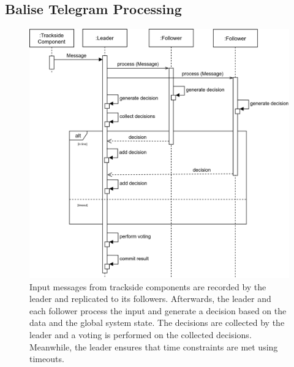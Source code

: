 \subsection{Balise Telegram Processing}
\label{subsec:ImpBaliseProcessing}
\begin{figure}[!hb]
	\centering
	\includegraphics[width=0.75\linewidth]{images/sequence/CollectResults}
	\caption{Input messages from trackside components are recorded by the leader and replicated to its followers. Afterwards, the leader and each follower process the input and generate a decision based on the data and the global system state. The decisions are collected by the leader and a voting is performed on the collected decisions. Meanwhile, the leader ensures that time constraints are met using timeouts.}
	\label{fig:SeqCollectResults}
\end{figure}


